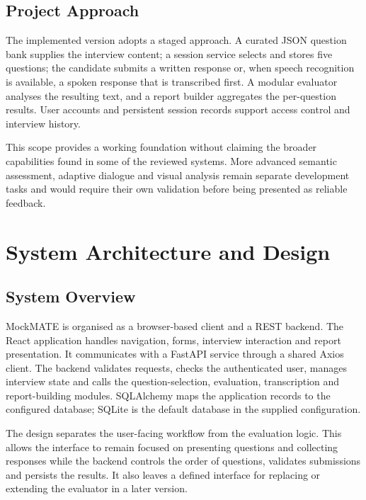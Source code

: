 \documentclass[12pt,a4paper,oneside]{report}
\begin{document}
\section{Project Approach}
The implemented version adopts a staged approach. A curated JSON question bank supplies the interview content; a session service selects and stores five questions; the candidate submits a written response or, when speech recognition is available, a spoken response that is transcribed first. A modular evaluator analyses the resulting text, and a report builder aggregates the per-question results. User accounts and persistent session records support access control and interview history.

This scope provides a working foundation without claiming the broader capabilities found in some of the reviewed systems. More advanced semantic assessment, adaptive dialogue and visual analysis remain separate development tasks and would require their own validation before being presented as reliable feedback.

\chapter{System Architecture and Design}

\section{System Overview}
MockMATE is organised as a browser-based client and a REST backend. The React application handles navigation, forms, interview interaction and report presentation. It communicates with a FastAPI service through a shared Axios client. The backend validates requests, checks the authenticated user, manages interview state and calls the question-selection, evaluation, transcription and report-building modules. SQLAlchemy maps the application records to the configured database; SQLite is the default database in the supplied configuration.

The design separates the user-facing workflow from the evaluation logic. This allows the interface to remain focused on presenting questions and collecting responses while the backend controls the order of questions, validates submissions and persists the results. It also leaves a defined interface for replacing or extending the evaluator in a later version.
\end{document}
